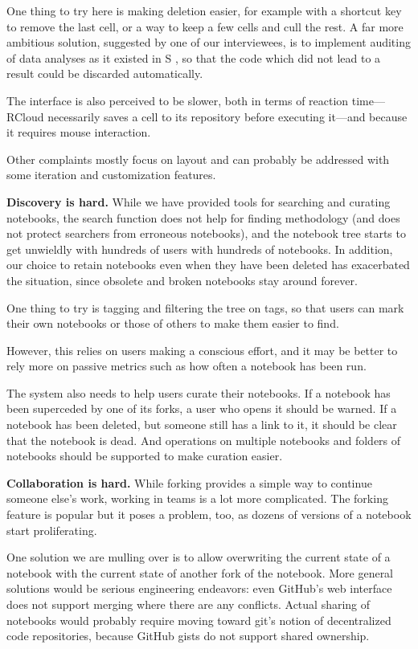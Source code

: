 One thing to try here is making deletion easier, for example with a
shortcut key to remove the last cell, or a way to keep a few cells and cull
the rest. A far more ambitious solution, suggested by one of our
interviewees, is to implement auditing of data analyses as it existed in
S \cite{Becker:1988:Auditing}, so that the code which did not lead to a
result could be discarded automatically.

The interface is also perceived to be slower, both in terms of reaction
time---RCloud necessarily saves a cell to its repository before executing
it---and because it requires mouse interaction.

Other complaints mostly focus on layout and can probably be addressed with
some iteration and customization features.

{\bf Discovery is hard.}
While we have provided tools for searching and curating notebooks, the
search function does not help for finding methodology (and does not protect
searchers from erroneous notebooks), and the notebook tree starts to get
unwieldly with hundreds of users with hundreds of notebooks. In addition,
our choice to retain notebooks even when they have been deleted has
exacerbated the situation, since obsolete and broken notebooks stay around
forever.

One thing to try is tagging and filtering the tree on tags, so that users
can mark their own notebooks or those of others to make them easier to
find.

However, this relies on users making a conscious effort, and it may be
better to rely more on passive metrics such as how often a notebook has
been run.

The system also needs to help users curate their notebooks. If a notebook
has been superceded by one of its forks, a user who opens it should be
warned. If a notebook has been deleted, but someone still has a link to it,
it should be clear that the notebook is dead. And operations on multiple
notebooks and folders of notebooks should be supported to make curation
easier.


{\bf Collaboration is hard.}
While forking provides a simple way to continue someone else's work, working
in teams is a lot more complicated. The forking feature is popular but it
poses a problem, too, as dozens of versions of a notebook start proliferating.

One solution we are mulling over is to allow overwriting the current state
of a notebook with the current state of another fork of the notebook. More
general solutions would be serious engineering endeavors: even GitHub's web
interface does not support merging where there are any conflicts. Actual
sharing of notebooks would probably require moving toward git's notion of
decentralized code repositories, because GitHub gists do not support shared
ownership.



